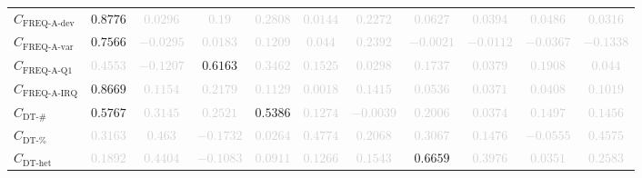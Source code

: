 \documentclass{standalone}
\newcommand{\actfreqdevname}{\text{FREQ-A-dev}}
\newcommand{\actfreqdev}{C_{\actfreqdevname}}
\newcommand{\actfreqvarname}{\text{FREQ-A-var}}
\newcommand{\actfreqvar}{C_{\actfreqvarname}}
\newcommand{\actfreqqonename}{\text{FREQ-A-Q1}}
\newcommand{\actfreqqone}{C_{\actfreqqonename}}
\newcommand{\actfreqiqrname}{\text{FREQ-A-IRQ}}
\newcommand{\actfreqiqr}{C_{\actfreqiqrname}}
\newcommand{\numberuniquetracesname}{\text{DT-\#}}
\newcommand{\numberuniquetraces}{C_{\numberuniquetracesname}}
\newcommand{\percentageuniquetracesname}{\text{DT-\%}}
\newcommand{\percentageuniquetraces}{C_{\percentageuniquetracesname}}
\newcommand{\dthetname}{\text{DT-het}}
\newcommand{\dthet}{C_{\dthetname}}
\begin{document}
\begin{tabular}{lcccccccccc}
$\actfreqdev$ & $0.8776$ & \textcolor{lightgray}{$0.0296$} & \textcolor{lightgray}{$0.19$} & \textcolor{lightgray}{$0.2808$} & \textcolor{lightgray}{$0.0144$} & \textcolor{lightgray}{$0.2272$} & \textcolor{lightgray}{$0.0627$} & \textcolor{lightgray}{$0.0394$} & \textcolor{lightgray}{$0.0486$} & \textcolor{lightgray}{$0.0316$} \\ 
$\actfreqvar$ & $0.7566$ & \textcolor{lightgray}{$-0.0295$} & \textcolor{lightgray}{$0.0183$} & \textcolor{lightgray}{$0.1209$} & \textcolor{lightgray}{$0.044$} & \textcolor{lightgray}{$0.2392$} & \textcolor{lightgray}{$-0.0021$} & \textcolor{lightgray}{$-0.0112$} & \textcolor{lightgray}{$-0.0367$} & \textcolor{lightgray}{$-0.1338$} \\ 
$\actfreqqone$ & \textcolor{lightgray}{$0.4553$} & \textcolor{lightgray}{$-0.1207$} & $0.6163$ & \textcolor{lightgray}{$0.3462$} & \textcolor{lightgray}{$0.1525$} & \textcolor{lightgray}{$0.0298$} & \textcolor{lightgray}{$0.1737$} & \textcolor{lightgray}{$0.0379$} & \textcolor{lightgray}{$0.1908$} & \textcolor{lightgray}{$0.044$} \\ 
$\actfreqiqr$ & $0.8669$ & \textcolor{lightgray}{$0.1154$} & \textcolor{lightgray}{$0.2179$} & \textcolor{lightgray}{$0.1129$} & \textcolor{lightgray}{$0.0018$} & \textcolor{lightgray}{$0.1415$} & \textcolor{lightgray}{$0.0536$} & \textcolor{lightgray}{$0.0371$} & \textcolor{lightgray}{$0.0408$} & \textcolor{lightgray}{$0.1019$} \\ 
$\numberuniquetraces$ & $0.5767$ & \textcolor{lightgray}{$0.3145$} & \textcolor{lightgray}{$0.2521$} & $0.5386$ & \textcolor{lightgray}{$0.1274$} & \textcolor{lightgray}{$-0.0039$} & \textcolor{lightgray}{$0.2006$} & \textcolor{lightgray}{$0.0374$} & \textcolor{lightgray}{$0.1497$} & \textcolor{lightgray}{$0.1456$} \\ 
$\percentageuniquetraces$ & \textcolor{lightgray}{$0.3163$} & \textcolor{lightgray}{$0.463$} & \textcolor{lightgray}{$-0.1732$} & \textcolor{lightgray}{$0.0264$} & \textcolor{lightgray}{$0.4774$} & \textcolor{lightgray}{$0.2068$} & \textcolor{lightgray}{$0.3067$} & \textcolor{lightgray}{$0.1476$} & \textcolor{lightgray}{$-0.0555$} & \textcolor{lightgray}{$0.4575$} \\ 
$\dthet$ & \textcolor{lightgray}{$0.1892$} & \textcolor{lightgray}{$0.4404$} & \textcolor{lightgray}{$-0.1083$} & \textcolor{lightgray}{$0.0911$} & \textcolor{lightgray}{$0.1266$} & \textcolor{lightgray}{$0.1543$} & $0.6659$ & \textcolor{lightgray}{$0.3976$} & \textcolor{lightgray}{$0.0351$} & \textcolor{lightgray}{$0.2583$} \\ 

\end{tabular}
\end{document}
